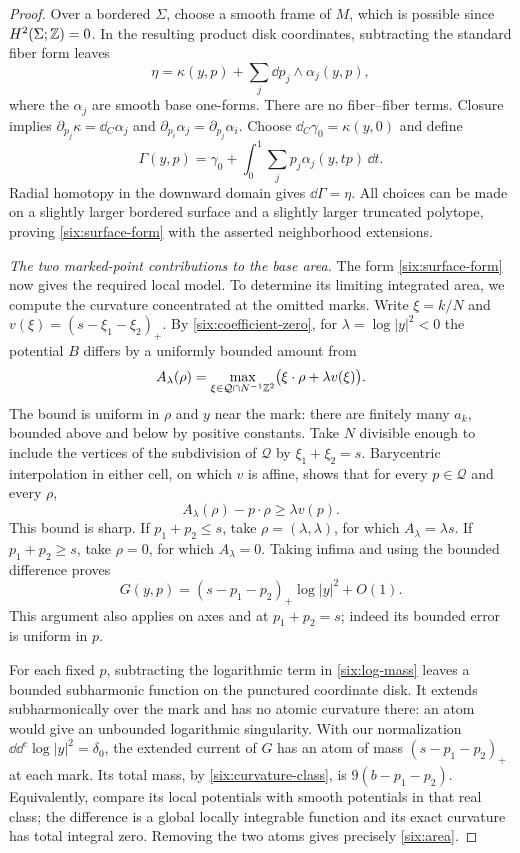 \begin{proof}
Over a bordered \(\Sigma\), choose a smooth frame of \(M\),
which is possible since \(H^2(\Sigma;\mathbb Z)=0\).
In the resulting product disk coordinates, subtracting the
standard fiber form leaves
\[
 \eta=\kappa(y,p)+
       \sum_j\dd p_j\wedge\alpha_j(y,p),
\]
where the \(\alpha_j\) are smooth base one-forms.
There are no fiber--fiber terms.  Closure implies
\(\partial_{p_j}\kappa=\dd_C\alpha_j\) and
\(\partial_{p_i}\alpha_j=\partial_{p_j}\alpha_i\).
Choose \(\dd_C\gamma_0=\kappa(y,0)\) and define
\[
 \Gamma(y,p)=\gamma_0+
       \int_0^1\sum_j p_j\alpha_j(y,tp)\,\dd t.
\]
Radial homotopy in the downward domain gives
\(\dd\Gamma=\eta\).  All choices can be made on a slightly
larger bordered surface and a slightly larger truncated
polytope, proving \eqref{six:surface-form} with the asserted
neighborhood extensions.

\medskip\noindent
\emph{The two marked-point contributions to the base area.}
The form \eqref{six:surface-form} now gives the required local model.
To determine its limiting integrated area, we compute the curvature
concentrated at the omitted marks.  Write \(\xi=k/N\) and
\(v(\xi)=(s-\xi_1-\xi_2)_+\).  By
\eqref{six:coefficient-zero}, for
\(\lambda=\log|y|^2<0\) the potential \(B\) differs by a
uniformly bounded amount from
\[
 A_\lambda(\rho)=
       \max_{\xi\in\mathcal Q\cap N^{-1}\mathbb Z^2}
            \bigl(\xi\cdot\rho+\lambda v(\xi)\bigr).
\]
The bound is uniform in \(\rho\) and \(y\) near the mark:
there are finitely many \(a_k\), bounded above and below by
positive constants.
Take \(N\) divisible enough to include the vertices of the
subdivision of \(\mathcal Q\) by \(\xi_1+\xi_2=s\).
Barycentric interpolation in either cell, on which \(v\) is
affine, shows that for every \(p\in\mathcal Q\) and every
\(\rho\),
\[
 A_\lambda(\rho)-p\cdot\rho\ge\lambda v(p).
\]
This bound is sharp.  If \(p_1+p_2\le s\), take
\(\rho=(\lambda,\lambda)\), for which
\(A_\lambda=\lambda s\).
If \(p_1+p_2\ge s\), take \(\rho=0\), for which
\(A_\lambda=0\).
Taking infima and using the bounded difference proves
\begin{equation}\label{six:log-mass}
 G(y,p)=(s-p_1-p_2)_+\log|y|^2+O(1).
\end{equation}
This argument also applies on axes and at \(p_1+p_2=s\);
indeed its bounded error is uniform in \(p\).

For each fixed \(p\), subtracting the logarithmic term in
\eqref{six:log-mass} leaves a bounded subharmonic function on
the punctured coordinate disk.  It extends subharmonically
over the mark and has no atomic curvature there: an atom
would give an unbounded logarithmic singularity.
With our normalization
\(\dd\dd^c\log|y|^2=\delta_0\), the extended current of \(G\)
has an atom of mass \((s-p_1-p_2)_+\) at each mark.
Its total mass, by \eqref{six:curvature-class}, is
\(9(b-p_1-p_2)\).  Equivalently, compare its local potentials
with smooth potentials in that real class; the difference
is a global locally integrable function and its exact
curvature has total integral zero.  Removing the two atoms
gives precisely \eqref{six:area}.


\end{proof}
